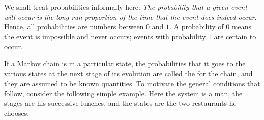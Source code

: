 \documentclass{ximera}
\begin{document}
We shall treat probabilities informally here: \textit{The probability that a given event will occur is the long-run proportion of the time that the event does indeed occur}. Hence, all probabilities are numbers between $0$ and $1$. A probability of $0$ means the event is impossible and never occurs; events with probability $1$ are certain to occur.


If a Markov chain is in a particular state, the probabilities that it goes to the various states at the next stage of its evolution are called the  for the chain, and they are assumed to be known quantities. To motivate the general conditions that follow, consider the following simple example. Here the system is a man, the stages are his successive lunches, and the states are the two restaurants he chooses.
\end{document}
